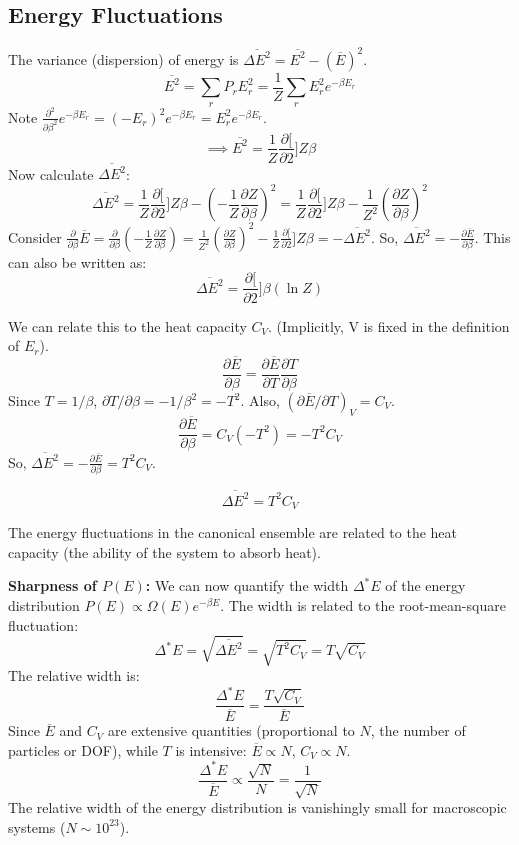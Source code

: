 \documentclass[11pt]{article}
\newcommand{\avg}[1]{\overline{#1}}
\newcommand{\pderiv}[2]{\frac{\partial #1}{\partial #2}}
\newcommand{\partfn}{Z} %
\begin{document}
\subsection*{Energy Fluctuations}
The variance (dispersion) of energy is $\overline{\Delta E^2} = \avg{E^2} - (\avg{E})^2$.
\[ \avg{E^2} = \sum_r P_r E_r^2 = \frac{1}{\partfn} \sum_r E_r^2 e^{-\beta E_r} \]
Note $\frac{\partial^2}{\partial \beta^2} e^{-\beta E_r} = (-E_r)^2 e^{-\beta E_r} = E_r^2 e^{-\beta E_r}$.
\[ \implies \avg{E^2} = \frac{1}{\partfn} \pderiv[2]{\partfn}{\beta} \]
Now calculate $\overline{\Delta E^2}$:
\[ \overline{\Delta E^2} = \frac{1}{\partfn} \pderiv[2]{\partfn}{\beta} - \left( -\frac{1}{\partfn} \pderiv{\partfn}{\beta} \right)^2 = \frac{1}{\partfn} \pderiv[2]{\partfn}{\beta} - \frac{1}{\partfn^2} \left( \pderiv{\partfn}{\beta} \right)^2 \]
Consider $\pderiv{}{\beta} \avg{E} = \pderiv{}{\beta} \left( -\frac{1}{\partfn} \pderiv{\partfn}{\beta} \right) = \frac{1}{\partfn^2} \left( \pderiv{\partfn}{\beta} \right)^2 - \frac{1}{\partfn} \pderiv[2]{\partfn}{\beta} = - \overline{\Delta E^2}$.
So, $\overline{\Delta E^2} = -\pderiv{\avg{E}}{\beta}$.
This can also be written as:
\[ \overline{\Delta E^2} = \pderiv[2]{}{\beta} (\ln \partfn) \]

We can relate this to the heat capacity $C_V$. (Implicitly, V is fixed in the definition of $E_r$).
\[ \pderiv{\avg{E}}{\beta} = \pderiv{\avg{E}}{T} \pderiv{T}{\beta} \]
Since $T = 1/\beta$, $\partial T / \partial \beta = -1/\beta^2 = -T^2$.
Also, $(\partial \avg{E} / \partial T)_V = C_V$.
\[ \pderiv{\avg{E}}{\beta} = C_V (-T^2) = -T^2 C_V \]
So, $\overline{\Delta E^2} = -\pderiv{\avg{E}}{\beta} = T^2 C_V$.
\begin{eqbox}
\[ \overline{\Delta E^2} = T^2 C_V \]
\end{eqbox}
The energy fluctuations in the canonical ensemble are related to the heat capacity (the ability of the system to absorb heat).

\textbf{Sharpness of $P(E)$:}
We can now quantify the width $\Delta^* E$ of the energy distribution $P(E) \propto \Omega(E)e^{-\beta E}$. The width is related to the root-mean-square fluctuation:
\[ \Delta^* E = \sqrt{\overline{\Delta E^2}} = \sqrt{T^2 C_V} = T \sqrt{C_V} \]
The relative width is:
\[ \frac{\Delta^* E}{\avg{E}} = \frac{T \sqrt{C_V}}{\avg{E}} \]
Since $\avg{E}$ and $C_V$ are extensive quantities (proportional to $N$, the number of particles or DOF), while $T$ is intensive: $\avg{E} \propto N$, $C_V \propto N$.
\[ \frac{\Delta^* E}{\avg{E}} \propto \frac{\sqrt{N}}{N} = \frac{1}{\sqrt{N}} \]
The relative width of the energy distribution is vanishingly small for macroscopic systems ($N \sim 10^{23}$).
\end{document}
